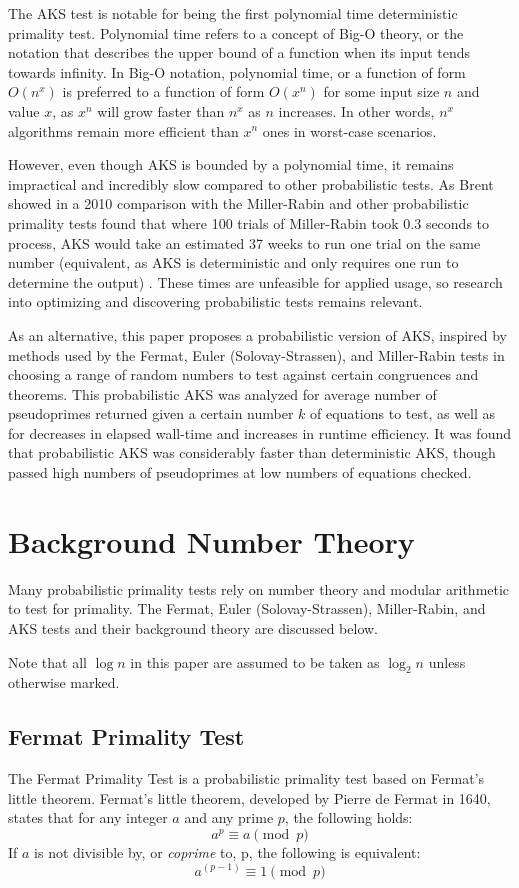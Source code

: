 \documentclass{article}
\begin{document}
The AKS test is notable for being the first polynomial time deterministic primality test. Polynomial time refers to a concept of Big-O theory, or the notation that describes the upper bound of a function when its input tends towards infinity. In Big-O notation, polynomial time, or a function of form $O(n^x)$ is preferred to a function of form $O(x^n)$ for some input size $n$ and value $x$, as $x^n$ will grow faster than $n^x$ as $n$ increases. In other words, $n^x$ algorithms remain more efficient than $x^n$ ones in worst-case scenarios. 

However, even though AKS is bounded by a polynomial time, it remains impractical and incredibly slow compared to other probabilistic tests. As Brent showed in a 2010 comparison with the Miller-Rabin and other probabilistic primality tests found that where 100 trials of Miller-Rabin took 0.3 seconds to process, AKS would take an estimated 37 weeks to run one trial on the same number (equivalent, as AKS is deterministic and only requires one run to determine the output) \cite{brent_primality_2010}. These times are unfeasible for applied usage, so research into optimizing and discovering probabilistic tests remains relevant.

As an alternative, this paper proposes a probabilistic version of AKS, inspired by methods used by the Fermat, Euler (Solovay-Strassen), and Miller-Rabin tests in choosing a range of random numbers to test against certain congruences and theorems. This probabilistic AKS was analyzed for average number of pseudoprimes returned given a certain number $k$ of equations to test, as well as for decreases in elapsed wall-time and increases in runtime efficiency. It was found that probabilistic AKS was considerably faster than deterministic AKS, though passed high numbers of pseudoprimes at low numbers of equations checked.

\section{Background Number Theory}

Many probabilistic primality tests rely on number theory and modular arithmetic to test for primality. The Fermat, Euler (Solovay-Strassen), Miller-Rabin, and AKS tests and their background theory are discussed below.

Note that all $\log{n}$ in this paper are assumed to be taken as $\log_{2}{n}$ unless otherwise marked.

\subsection{Fermat Primality Test}
The Fermat Primality Test is a probabilistic primality test based on Fermat's little theorem.
Fermat's little theorem, developed by Pierre de Fermat in 1640, states that for any integer $a$ and any prime $p$, the following holds:
\[
    a^p \equiv a \pmod{p} 
\]
If $a$ is not divisible by, or \emph{coprime} to, p, the following is equivalent:
\[
    a^{(p - 1)} \equiv 1 \pmod{p} 
\]
\end{document}
